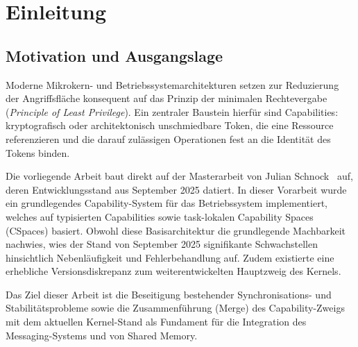 \chapter{Einleitung}

\section{Motivation und Ausgangslage}

Moderne Mikrokern- und Betriebssystemarchitekturen setzen zur Reduzierung der Angriffsfläche konsequent auf das Prinzip der minimalen Rechtevergabe (\textit{Principle of Least Privilege}). Ein zentraler Baustein hierfür sind Capabilities: kryptografisch oder architektonisch unschmiedbare Token, die eine Ressource referenzieren und die darauf zulässigen Operationen fest an die Identität des Tokens binden.

Die vorliegende Arbeit baut direkt auf der Masterarbeit von Julian Schnock~\cite{schnock2025} auf, deren Entwicklungsstand aus September 2025 datiert. In dieser Vorarbeit wurde ein grundlegendes Capability-System für das Betriebssystem implementiert, welches auf typisierten Capabilities sowie task-lokalen Capability Spaces (CSpaces) basiert. Obwohl diese Basisarchitektur die grundlegende Machbarkeit nachwies, wies der Stand von September 2025 signifikante Schwachstellen hinsichtlich Nebenläufigkeit und Fehlerbehandlung auf. Zudem existierte eine erhebliche Versionsdiskrepanz zum weiterentwickelten Hauptzweig des Kernels.

Das Ziel dieser Arbeit ist die Beseitigung bestehender Synchronisations- und Stabilitätsprobleme sowie die Zusammenführung (Merge) des Capability-Zweigs mit dem aktuellen Kernel-Stand als Fundament für die Integration des Messaging-Systems und von Shared Memory.